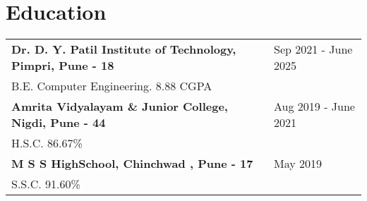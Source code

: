 \documentclass[a4paper,10pt]{article}
\makeatletter
\newenvironment{joblong}[2]
    {
    \begin{tabularx}{\linewidth}{@{}l X r@{}}
    \textbf{#1} & \hfill &  #2 \\[3.75pt]
    \end{tabularx}
    \begin{minipage}[t]{\linewidth}
    \begin{itemize}[nosep,after=\strut, leftmargin=1em, itemsep=3pt,label=--]
    }
    {
    \end{itemize}
    \end{minipage}    
    }
\makeatother
\begin{document}

\section{Education}
\begin{tabularx}{\linewidth}{@{}l X@{}}	


    \textbf{Dr. D. Y. Patil Institute of Technology, Pimpri, Pune - 18} & \hfill Sep 2021 - June 2025 \\ \vspace*{2mm}
    B.E. Computer Engineering. 8.88 CGPA \\ 
    
    \textbf{Amrita Vidyalayam \& Junior College, Nigdi, Pune - 44} & \hfill Aug 2019 - June 2021 \\ \vspace*{2mm}
    H.S.C. 86.67\% \\ 
    
    \textbf{M S S HighSchool, Chinchwad , Pune - 17} & \hfill May 2019 \\ \vspace*{2mm}
    S.S.C. 91.60\% \\

\end{tabularx}
\end{document}
